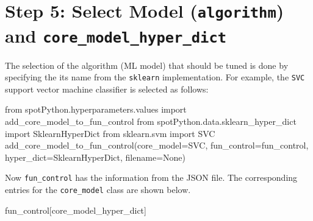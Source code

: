 \documentclass[
  letterpaper,
  DIV=11,
  numbers=noendperiod]{scrreprt}
\newenvironment{Shaded}{\begin{snugshade}}{\end{snugshade}}
\newcommand{\ImportTok}[1]{\textcolor[rgb]{0.00,0.46,0.62}{#1}}
\newcommand{\NormalTok}[1]{\textcolor[rgb]{0.00,0.23,0.31}{#1}}
\newcommand{\OperatorTok}[1]{\textcolor[rgb]{0.37,0.37,0.37}{#1}}
\newcommand{\StringTok}[1]{\textcolor[rgb]{0.13,0.47,0.30}{#1}}
\newcommand{\VariableTok}[1]{\textcolor[rgb]{0.07,0.07,0.07}{#1}}
\begin{document}
\hypertarget{step-5-select-model-algorithm-and-core_model_hyper_dict}{%
\section{\texorpdfstring{Step 5: Select Model (\texttt{algorithm}) and
\texttt{core\_model\_hyper\_dict}}{Step 5: Select Model (algorithm) and core\_model\_hyper\_dict}}\label{step-5-select-model-algorithm-and-core_model_hyper_dict}}

The selection of the algorithm (ML model) that should be tuned is done
by specifying the its name from the \texttt{sklearn} implementation. For
example, the \texttt{SVC} support vector machine classifier is selected
as follows:

\begin{Shaded}
\begin{Highlighting}[]
\ImportTok{from}\NormalTok{ spotPython.hyperparameters.values }\ImportTok{import}\NormalTok{ add\_core\_model\_to\_fun\_control}
\ImportTok{from}\NormalTok{ spotPython.data.sklearn\_hyper\_dict }\ImportTok{import}\NormalTok{ SklearnHyperDict}
\ImportTok{from}\NormalTok{ sklearn.svm }\ImportTok{import}\NormalTok{ SVC}
\NormalTok{add\_core\_model\_to\_fun\_control(core\_model}\OperatorTok{=}\NormalTok{SVC,}
\NormalTok{                              fun\_control}\OperatorTok{=}\NormalTok{fun\_control,}
\NormalTok{                              hyper\_dict}\OperatorTok{=}\NormalTok{SklearnHyperDict,}
\NormalTok{                              filename}\OperatorTok{=}\VariableTok{None}\NormalTok{)}
\end{Highlighting}
\end{Shaded}

Now \texttt{fun\_control} has the information from the JSON file. The
corresponding entries for the \texttt{core\_model} class are shown
below.

\begin{Shaded}
\begin{Highlighting}[]
\NormalTok{fun\_control[}\StringTok{\textquotesingle{}core\_model\_hyper\_dict\textquotesingle{}}\NormalTok{]}
\end{Highlighting}
\end{Shaded}
\end{document}
